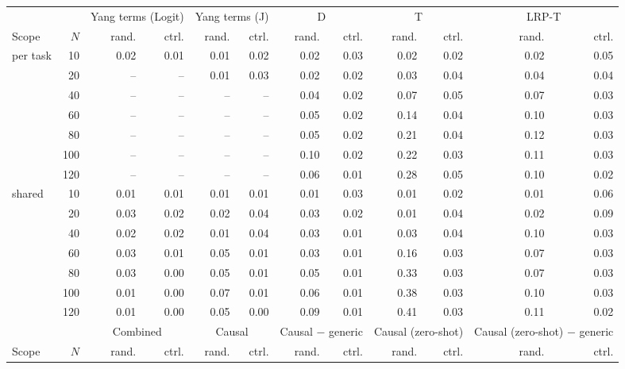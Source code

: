 \begin{tabular}{@{}lrrrrrrrrrrr@{}}
\toprule
& & \multicolumn{2}{c}{Yang terms (Logit)} & \multicolumn{2}{c}{Yang terms (J)} & \multicolumn{2}{c}{D} & \multicolumn{2}{c}{T} & \multicolumn{2}{c}{LRP-T} \\
\cmidrule(lr){3-4} \cmidrule(lr){5-6} \cmidrule(lr){7-8} \cmidrule(lr){9-10} \cmidrule(lr){11-12}
Scope & $N$ & rand. & ctrl. & rand. & ctrl. & rand. & ctrl. & rand. & ctrl. & rand. & ctrl. \\
\midrule
per task & 10 & 0.02 & 0.01 & 0.01 & 0.02 & 0.02 & 0.03 & 0.02 & 0.02 & 0.02 & 0.05 \\
 & 20 & -- & -- & 0.01 & 0.03 & 0.02 & 0.02 & 0.03 & 0.04 & 0.04 & 0.04 \\
 & 40 & -- & -- & -- & -- & 0.04 & 0.02 & 0.07 & 0.05 & 0.07 & 0.03 \\
 & 60 & -- & -- & -- & -- & 0.05 & 0.02 & 0.14 & 0.04 & 0.10 & 0.03 \\
 & 80 & -- & -- & -- & -- & 0.05 & 0.02 & 0.21 & 0.04 & 0.12 & 0.03 \\
 & 100 & -- & -- & -- & -- & 0.10 & 0.02 & 0.22 & 0.03 & 0.11 & 0.03 \\
 & 120 & -- & -- & -- & -- & 0.06 & 0.01 & 0.28 & 0.05 & 0.10 & 0.02 \\
\addlinespace
shared & 10 & 0.01 & 0.01 & 0.01 & 0.01 & 0.01 & 0.03 & 0.01 & 0.02 & 0.01 & 0.06 \\
 & 20 & 0.03 & 0.02 & 0.02 & 0.04 & 0.03 & 0.02 & 0.01 & 0.04 & 0.02 & 0.09 \\
 & 40 & 0.02 & 0.02 & 0.01 & 0.04 & 0.03 & 0.01 & 0.03 & 0.04 & 0.10 & 0.03 \\
 & 60 & 0.03 & 0.01 & 0.05 & 0.01 & 0.03 & 0.01 & 0.16 & 0.03 & 0.07 & 0.03 \\
 & 80 & 0.03 & 0.00 & 0.05 & 0.01 & 0.05 & 0.01 & 0.33 & 0.03 & 0.07 & 0.03 \\
 & 100 & 0.01 & 0.00 & 0.07 & 0.01 & 0.06 & 0.01 & 0.38 & 0.03 & 0.10 & 0.03 \\
 & 120 & 0.01 & 0.00 & 0.05 & 0.00 & 0.09 & 0.01 & 0.41 & 0.03 & 0.11 & 0.02 \\
\midrule[\heavyrulewidth]
& & \multicolumn{2}{c}{Combined} & \multicolumn{2}{c}{Causal} & \multicolumn{2}{c}{Causal $-$ generic} & \multicolumn{2}{c}{Causal (zero-shot)} & \multicolumn{2}{c}{Causal (zero-shot) $-$ generic} \\
\cmidrule(lr){3-4} \cmidrule(lr){5-6} \cmidrule(lr){7-8} \cmidrule(lr){9-10} \cmidrule(lr){11-12}
Scope & $N$ & rand. & ctrl. & rand. & ctrl. & rand. & ctrl. & rand. & ctrl. & rand. & ctrl. \\

\end{tabular}
